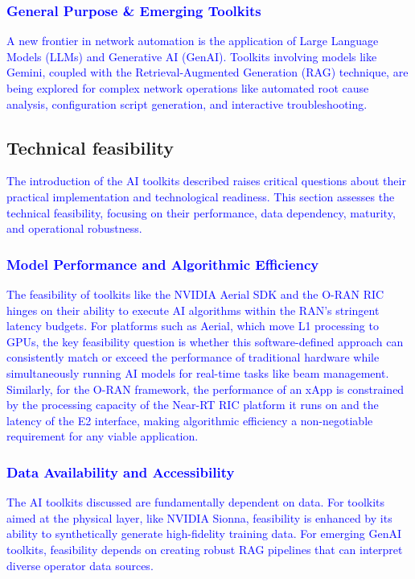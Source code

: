 \documentclass[conference]{IEEEtran}
\begin{document}
\textcolor{blue}{\subsubsection{General Purpose \& Emerging Toolkits}
A new frontier in network automation is the application of Large Language Models (LLMs) and Generative AI (GenAI). Toolkits involving models like Gemini, coupled with the Retrieval-Augmented Generation (RAG) technique, are being explored for complex network operations like automated root cause analysis, configuration script generation, and interactive troubleshooting.}

\subsection{Technical feasibility}
\textcolor{blue}{The introduction of the AI toolkits described raises critical questions about their practical implementation and technological readiness. This section assesses the technical feasibility, focusing on their performance, data dependency, maturity, and operational robustness.}

\textcolor{blue}{\subsubsection{Model Performance and Algorithmic Efficiency}
The feasibility of toolkits like the NVIDIA Aerial SDK and the O-RAN RIC hinges on their ability to execute AI algorithms within the RAN’s stringent latency budgets. For platforms such as Aerial, which move L1 processing to GPUs, the key feasibility question is whether this software-defined approach can consistently match or exceed the performance of traditional hardware while simultaneously running AI models for real-time tasks like beam management. Similarly, for the O-RAN framework, the performance of an xApp is constrained by the processing capacity of the Near-RT RIC platform it runs on and the latency of the E2 interface, making algorithmic efficiency a non-negotiable requirement for any viable application.}

\textcolor{blue}{\subsubsection{Data Availability and Accessibility}
The AI toolkits discussed are fundamentally dependent on data. For toolkits aimed at the physical layer, like NVIDIA Sionna, feasibility is enhanced by its ability to synthetically generate high-fidelity training data. For emerging GenAI toolkits, feasibility depends on creating robust RAG pipelines that can interpret diverse operator data sources.}
\end{document}
